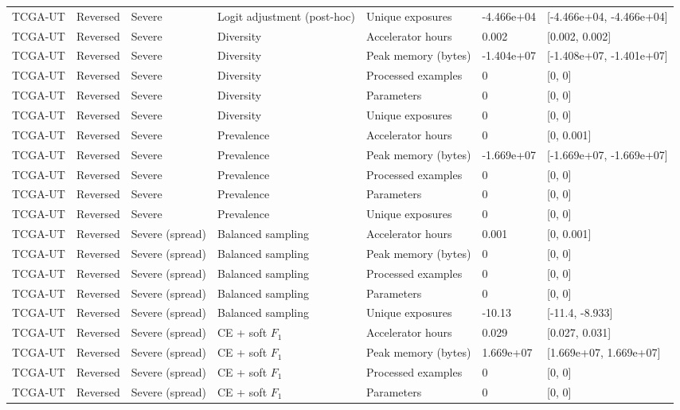 \begin{longtable}{lllllll}
TCGA-UT & Reversed & Severe & Logit adjustment (post-hoc) & Unique exposures & -4.466e+04 & [-4.466e+04, -4.466e+04] \\
TCGA-UT & Reversed & Severe & Diversity & Accelerator hours & 0.002 & [0.002, 0.002] \\
TCGA-UT & Reversed & Severe & Diversity & Peak memory (bytes) & -1.404e+07 & [-1.408e+07, -1.401e+07] \\
TCGA-UT & Reversed & Severe & Diversity & Processed examples & 0 & [0, 0] \\
TCGA-UT & Reversed & Severe & Diversity & Parameters & 0 & [0, 0] \\
TCGA-UT & Reversed & Severe & Diversity & Unique exposures & 0 & [0, 0] \\
TCGA-UT & Reversed & Severe & Prevalence & Accelerator hours & 0 & [0, 0.001] \\
TCGA-UT & Reversed & Severe & Prevalence & Peak memory (bytes) & -1.669e+07 & [-1.669e+07, -1.669e+07] \\
TCGA-UT & Reversed & Severe & Prevalence & Processed examples & 0 & [0, 0] \\
TCGA-UT & Reversed & Severe & Prevalence & Parameters & 0 & [0, 0] \\
TCGA-UT & Reversed & Severe & Prevalence & Unique exposures & 0 & [0, 0] \\
TCGA-UT & Reversed & Severe (spread) & Balanced sampling & Accelerator hours & 0.001 & [0, 0.001] \\
TCGA-UT & Reversed & Severe (spread) & Balanced sampling & Peak memory (bytes) & 0 & [0, 0] \\
TCGA-UT & Reversed & Severe (spread) & Balanced sampling & Processed examples & 0 & [0, 0] \\
TCGA-UT & Reversed & Severe (spread) & Balanced sampling & Parameters & 0 & [0, 0] \\
TCGA-UT & Reversed & Severe (spread) & Balanced sampling & Unique exposures & -10.13 & [-11.4, -8.933] \\
TCGA-UT & Reversed & Severe (spread) & CE + soft $F_1$ & Accelerator hours & 0.029 & [0.027, 0.031] \\
TCGA-UT & Reversed & Severe (spread) & CE + soft $F_1$ & Peak memory (bytes) & 1.669e+07 & [1.669e+07, 1.669e+07] \\
TCGA-UT & Reversed & Severe (spread) & CE + soft $F_1$ & Processed examples & 0 & [0, 0] \\
TCGA-UT & Reversed & Severe (spread) & CE + soft $F_1$ & Parameters & 0 & [0, 0] \\

\end{longtable}
